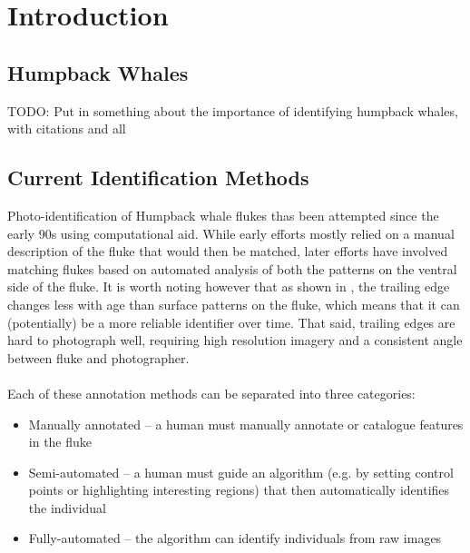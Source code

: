  
\chapter{Introduction} \label{sec:introduction}
 
\section{Humpback Whales}

TODO: Put in something about the importance of identifying humpback whales, with citations and all

\section{Current Identification Methods}

Photo-identification of Humpback whale flukes thas been attempted since the early 90s \cite{mizroch1990computer} using computational aid.
While early efforts mostly relied on a manual description of the fluke that would then be matched, later efforts have involved matching flukes based on automated analysis of both the patterns on the ventral side of the fluke.
It is worth noting however that as shown in \cite{blackmer2000temporal}, the trailing edge changes less with age than surface patterns on the fluke, which means that it can (potentially) be a more reliable identifier over time.
That said, trailing edges are hard to photograph well, requiring high resolution imagery and a consistent angle between fluke and photographer.
\\\\
Each of these annotation methods can be separated into three categories:

\begin{itemize}
	\item Manually annotated -- a human must manually annotate or catalogue features in the fluke
	\item Semi-automated -- a human must guide an algorithm (e.g. by setting control points or highlighting interesting regions) that then automatically identifies the individual
	\item Fully-automated -- the algorithm can identify individuals from raw images
\end{itemize}

